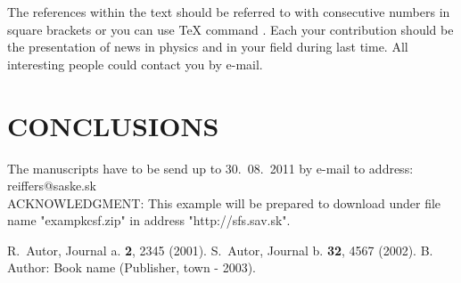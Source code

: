 \documentclass[twoside]{articlek}
\begin{document}
The references within the text should be referred to with
consecutive numbers in square brackets or you can use TeX command
\cite{RA_82}. Each your contribution should be the presentation of
news in physics and in your field during last time. All
interesting people could contact you by e-mail.

\section{CONCLUSIONS}

The manuscripts have to be send up to 30.~08.~2011 by e-mail to
address: reiffers@saske.sk\\

\noindent ACKNOWLEDGMENT: This example will be prepared to
download under file name "exampkcsf.zip" in address
"http://sfs.sav.sk".\\

\begin{thebibliography}{99}

\leftskip=-5pt \vspace{-0.3truecm}
 R.~Autor, Journal a. {\bf 2}, 2345 (2001).
 S.~Autor, Journal b. {\bf 32}, 4567 (2002).
 B. Author: Book name (Publisher, town - 2003).
\end{thebibliography}
\end{document}
